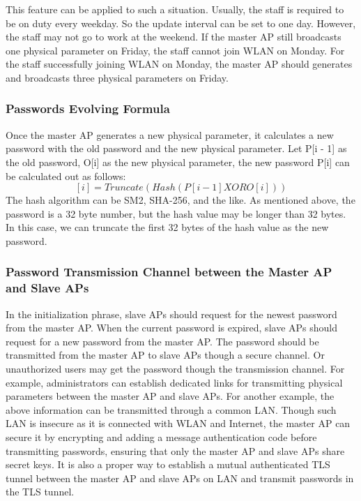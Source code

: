 This feature can be applied to such a situation. Usually, the staff is required to be on duty every weekday. So the update interval can be set to one day. However, the staff may not go to work at the weekend. If the master AP still broadcasts one physical parameter on Friday, the staff cannot join WLAN on Monday. For the staff successfully joining WLAN on Monday, the master AP should generates and broadcasts three physical parameters on Friday. 

\subsubsection{Passwords Evolving Formula}
Once the master AP generates a new physical parameter, it calculates a new password with the old password and the new physical parameter. Let P[i - 1] as the old password, O[i] as the new physical parameter, the new password P[i] can be calculated out as follows: $$[i] = Truncate(Hash(P[i - 1] XOR O[i]))$$ The hash algorithm can be SM2, SHA-256, and the like. As mentioned above, the password is a 32 byte number, but the hash value may be longer than 32 bytes. In this case, we can truncate the first 32 bytes of the hash value as the new password. 

\subsubsection{Password Transmission Channel between the Master AP and Slave APs}
In the initialization phrase, slave APs should request for the newest password from the master AP. When the current password is expired, slave APs should request for a new password from the master AP. The password should be transmitted from the master AP to slave APs though a secure channel. Or unauthorized users may get the password though the transmission channel. For example, administrators can establish dedicated links for transmitting physical parameters between the master AP and slave APs. For another example, the above information can be transmitted through a common LAN. Though such LAN is insecure as it is connected with WLAN and Internet, the master AP can secure it by encrypting and adding a message authentication code before transmitting passwords, ensuring that only the master AP and slave APs share secret keys. It is also a proper way to establish a mutual authenticated TLS tunnel between the master AP and slave APs on LAN and transmit passwords in the TLS tunnel. 

